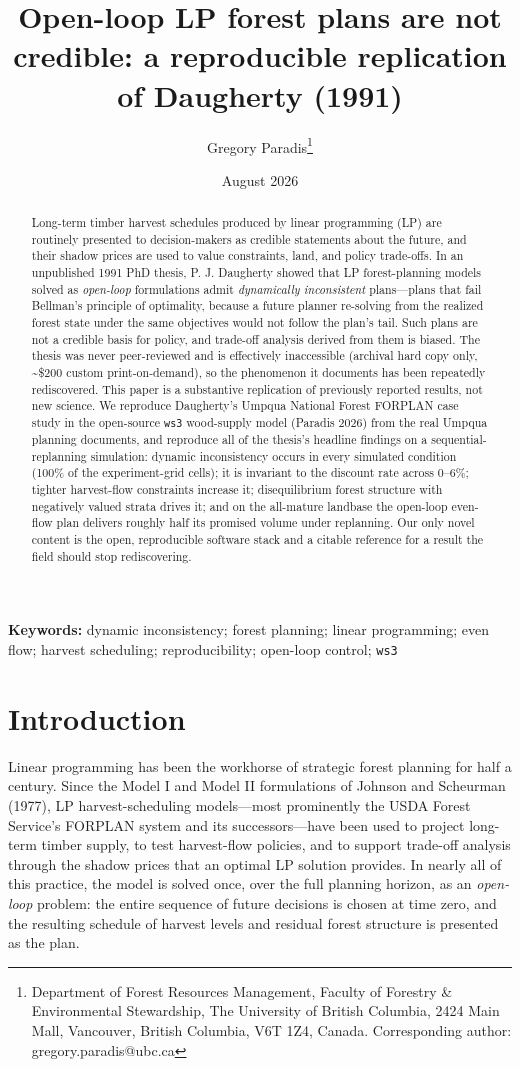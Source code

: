 \documentclass[12pt]{article}
\title{Open-loop LP forest plans are not credible: a reproducible replication of Daugherty (1991)}
\author{Gregory Paradis\thanks{Department of Forest Resources Management,
Faculty of Forestry \& Environmental Stewardship, The University of British
Columbia, 2424 Main Mall, Vancouver, British Columbia, V6T 1Z4, Canada.
Corresponding author: gregory.paradis@ubc.ca}}
\date{August 2026}
\begin{document}
\maketitle
\begin{abstract}
Long-term timber harvest schedules produced by linear programming (LP) are routinely presented to decision-makers as credible statements about the future, and their shadow prices are used to value constraints, land, and policy trade-offs. In an unpublished 1991 PhD thesis, P. J. Daugherty showed that LP forest-planning models solved as \emph{open-loop} formulations admit \emph{dynamically inconsistent} plans---plans that fail Bellman's principle of optimality, because a future planner re-solving from the realized forest state under the same objectives would not follow the plan's tail. Such plans are not a credible basis for policy, and trade-off analysis derived from them is biased. The thesis was never peer-reviewed and is effectively inaccessible (archival hard copy only, \textasciitilde\$200 custom print-on-demand), so the phenomenon it documents has been repeatedly rediscovered. This paper is a substantive replication of previously reported results, not new science. We reproduce Daugherty's Umpqua National Forest FORPLAN case study in the open-source \texttt{ws3} wood-supply model (Paradis 2026) from the real Umpqua planning documents, and reproduce all of the thesis's headline findings on a sequential-replanning simulation: dynamic inconsistency occurs in every simulated condition (100\% of the experiment-grid cells); it is invariant to the discount rate across 0--6\%; tighter harvest-flow constraints increase it; disequilibrium forest structure with negatively valued strata drives it; and on the all-mature landbase the open-loop even-flow plan delivers roughly half its promised volume under replanning. Our only novel content is the open, reproducible software stack and a citable reference for a result the field should stop rediscovering.
\end{abstract}
\noindent\textbf{Keywords:} dynamic inconsistency; forest planning; linear programming; even flow; harvest scheduling; reproducibility; open-loop control; \texttt{ws3}

\hypertarget{introduction}{%
\section{Introduction}\label{introduction}}

Linear programming has been the workhorse of strategic forest planning for half a century. Since the Model I and Model II formulations of Johnson and Scheurman (1977), LP harvest-scheduling models---most prominently the USDA Forest Service's FORPLAN system and its successors---have been used to project long-term timber supply, to test harvest-flow policies, and to support trade-off analysis through the shadow prices that an optimal LP solution provides. In nearly all of this practice, the model is solved once, over the full planning horizon, as an \emph{open-loop} problem: the entire sequence of future decisions is chosen at time zero, and the resulting schedule of harvest levels and residual forest structure is presented as the plan.
\end{document}
